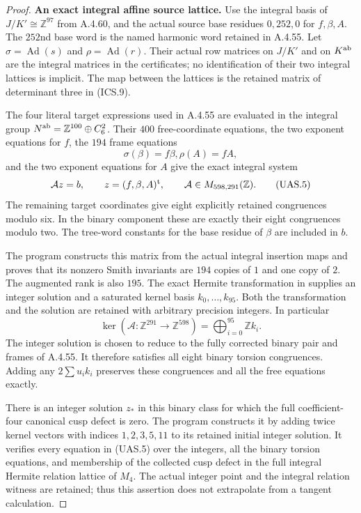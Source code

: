 \begin{proof}
\par\medskip\noindent\textbf{An exact integral affine source lattice.}\quad
Use the integral basis of $J/K'\cong\mathbb Z^{97}$ from A.4.60,
and the actual source base residues $0,252,0$ for $f,\beta,A$.
The $252$nd base word is the named harmonic word retained in
A.4.55.  Let $\sigma=\operatorname{Ad}(s)$ and
$\rho=\operatorname{Ad}(r)$.  Their actual row matrices on $J/K'$
and on $K^{\rm ab}$ are the integral matrices in the certificates;
no identification of their two integral lattices is implicit.
The map between the lattices is the retained matrix of determinant
three in (ICS.9).

The four literal target expressions used in A.4.55 are evaluated in
the integral group $N^{\rm ab}=\mathbb Z^{100}\oplus C_6^2$.
Their $400$ free-coordinate equations, the two exponent equations
for $f$, the $194$ frame equations
\[
                 \sigma(\beta)=f\beta,
                 \rho(A)=fA,                                    \tag{UAS.4}
\]
and the two exponent equations for $A$ give the exact integral system
\[
     \mathcal A z=b,\qquad z=(f,\beta,A)^{\rm t},\qquad
     \mathcal A\in M_{598,291}(\mathbb Z).
                                                                    \tag{UAS.5}
\]
The remaining target coordinates give eight explicitly retained
congruences modulo six.  In the binary component these are exactly
their eight congruences modulo two.  The tree-word constants for
the base residue of $\beta$ are included in $b$.

The program  constructs this
matrix from the actual integral insertion maps and proves that its
nonzero Smith invariants are $194$ copies of $1$ and one copy of $2$.
The augmented rank is also $195$.
The exact Hermite transformation in
 supplies an integer solution
and a saturated kernel basis $k_0,\ldots,k_{95}$.
Both the transformation and the solution are retained with arbitrary
precision integers.  In particular
\[
 \ker(\mathcal A:\mathbb Z^{291}\to\mathbb Z^{598})
          =\bigoplus_{i=0}^{95}\mathbb Z k_i.                       \tag{UAS.6}
\]
The integer solution is chosen to reduce to the fully corrected
binary pair and frames of A.4.55.  It therefore satisfies all eight
binary torsion congruences.  Adding any $2\sum u_i k_i$ preserves
these congruences and all the free equations exactly.

There is an integer solution $z_*$ in this binary class for which
the full coefficient-four canonical cusp defect is zero.
The program  constructs it by
adding twice kernel vectors with indices $1,2,3,5,11$ to its
retained initial integer solution.  It verifies every equation in
(UAS.5) over the integers, all the binary torsion equations, and
membership of the collected cusp defect in the full integral
Hermite relation lattice of $M_4$.  The actual integer point and
the integral relation witness are retained; thus this assertion
does not extrapolate from a tangent calculation.


\end{proof}
